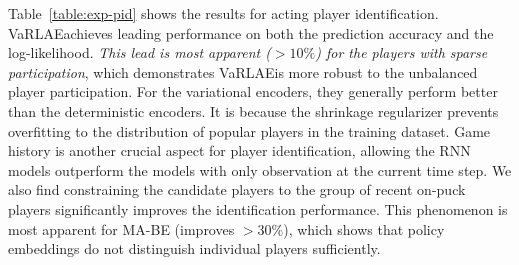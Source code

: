 \documentclass[letterpaper]{article} %
\newcommand{\system}{VaRLAE\;}
\begin{document}
Table~\ref{table:exp-pid} shows the results for acting player identification. \system achieves leading performance on both the prediction accuracy and the log-likelihood. {\it This lead is most apparent ($>10\%$) for the players with sparse participation}, which demonstrates \system is more robust to the unbalanced player participation. For the variational encoders, they generally perform better than the deterministic encoders. It is because the shrinkage regularizer prevents overfitting to the distribution of popular players in the training dataset.
Game history is another crucial aspect for player identification, allowing the RNN models outperform the models with only observation at the current time step.
We also find constraining the candidate players to the group of recent on-puck players significantly improves the identification performance. This phenomenon is most apparent for MA-BE (improves $>30\%$), which shows that policy embeddings do not distinguish individual players sufficiently. 
\end{document}

